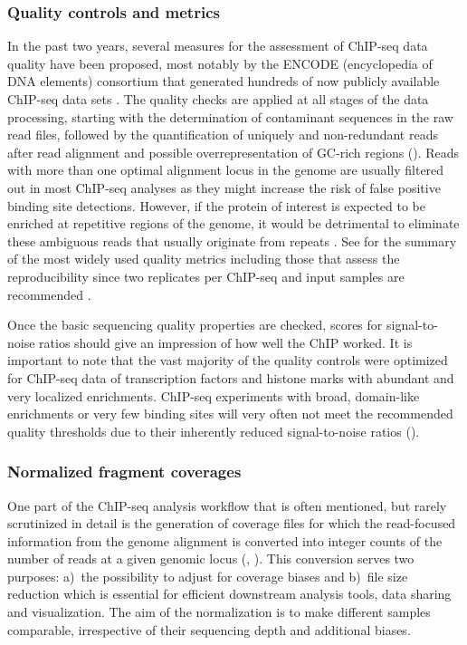 \subsubsection{Quality controls and metrics}
%
In the past two years, several measures for the assessment of ChIP-seq data quality have been proposed, most notably by the ENCODE (encyclopedia of DNA elements) consortium that generated hundreds of now publicly available ChIP-seq data sets \citep{Consortium2012}. The quality checks are applied at all stages of the data processing, starting with the determination of contaminant sequences in the raw read files, followed by the quantification of uniquely and non-redundant reads after read alignment and possible overrepresentation of GC-rich regions (). Reads with more than one optimal alignment locus in the genome are usually filtered out in most ChIP-seq analyses as they might increase the risk of false positive binding site detections. However, if the protein of interest is expected to be enriched at repetitive regions of the genome, it would be detrimental to eliminate these ambiguous reads that usually originate from repeats \citep{Treangen2012}. See  for the summary of the most widely used quality metrics including those that assess the reproducibility since two replicates per ChIP-seq and input samples are recommended \citep{Rozowsky2009, Landt2012}.

Once the basic sequencing quality properties are checked, scores for signal-to-noise ratios should give an impression of how well the ChIP worked. It is important to note that the vast majority of the quality controls were optimized for ChIP-seq data of transcription factors and histone marks with abundant and very localized enrichments. ChIP-seq experiments with broad, domain-like enrichments or very few binding sites will very often not meet the recommended quality thresholds due to their inherently reduced signal-to-noise ratios \citep{bamFingerprint, Landt2012, Bailey2013, Diaz2012} (). 
%
\subsubsection{Normalized fragment coverages}
One part of the ChIP-seq analysis workflow that is often mentioned, but rarely scrutinized in detail is the generation of coverage files for which the read-focused information from the genome alignment is converted into integer counts of the number of reads at a given genomic locus (, ). This conversion serves two purposes: a)~the possibility to adjust for coverage biases and b)~file size reduction which is essential for efficient downstream analysis tools, data sharing and visualization. The aim of the normalization is to make different samples comparable, irrespective of their sequencing depth and additional biases. 

